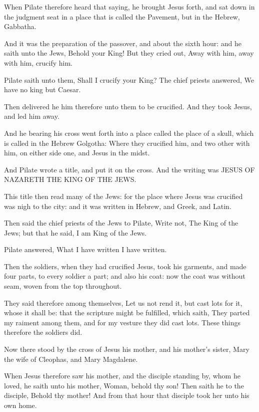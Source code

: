 \Verse When Pilate therefore heard that saying, he brought Jesus forth, and sat down in the judgment seat in a place that is called the Pavement, but in the Hebrew, Gabbatha.

\Verse And it was the preparation of the passover, and about the sixth hour: and he saith unto the Jews, Behold your King!  \Verse But they cried out, Away with him, away with him, crucify him.

Pilate saith unto them, Shall I crucify your King? The chief priests answered, We have no king but Caesar.

\Verse Then delivered he him therefore unto them to be crucified. And they took Jesus, and led him away.

\Verse And he bearing his cross went forth into a place called the place of a skull, which is called in the Hebrew Golgotha: \Verse Where they crucified him, and two other with him, on either side one, and Jesus in the midst.

\Verse And Pilate wrote a title, and put it on the cross. And the writing was JESUS OF NAZARETH THE KING OF THE JEWS.

\Verse This title then read many of the Jews: for the place where Jesus was crucified was nigh to the city: and it was written in Hebrew, and Greek, and Latin.

\Verse Then said the chief priests of the Jews to Pilate, Write not, The King of the Jews; but that he said, I am King of the Jews.

\Verse Pilate answered, What I have written I have written.

\Verse Then the soldiers, when they had crucified Jesus, took his garments, and made four parts, to every soldier a part; and also his coat: now the coat was without seam, woven from the top throughout.

\Verse They said therefore among themselves, Let us not rend it, but cast lots for it, whose it shall be: that the scripture might be fulfilled, which saith, They parted my raiment among them, and for my vesture they did cast lots. These things therefore the soldiers did.

\Verse Now there stood by the cross of Jesus his mother, and his mother's sister, Mary the wife of Cleophas, and Mary Magdalene.

\Verse When Jesus therefore saw his mother, and the disciple standing by, whom he loved, he saith unto his mother, Woman, behold thy son!  \Verse Then saith he to the disciple, Behold thy mother! And from that hour that disciple took her unto his own home.

